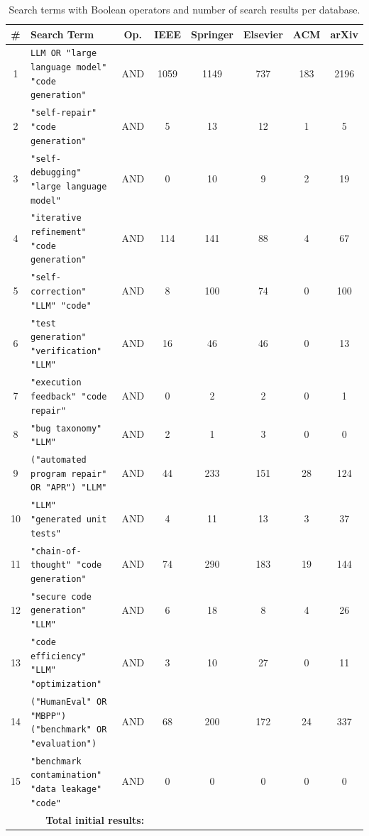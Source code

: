 \documentclass[10pt,a4paper]{article}
\begin{document}
\begin{table}[!t]
\centering
\caption{Search terms with Boolean operators and number of search 
results per database.}
\label{tab:search_terms}
\small
\begin{tabular}{@{}clcccccc@{}}
\toprule
\textbf{\#} & \textbf{Search Term} & \textbf{Op.} 
& \textbf{IEEE} & \textbf{Springer} 
& \textbf{Elsevier} & \textbf{ACM} & \textbf{arXiv} \\
\midrule
1  & \texttt{LLM OR "large language model" "code generation"} 
   & AND & 1059 & 1149 & 737  & 183 & 2196 \\
2  & \texttt{"self-repair" "code generation"} 
   & AND & 5    & 13   & 12   & 1   & 5    \\
3  & \texttt{"self-debugging" "large language model"} 
   & AND & 0    & 10   & 9    & 2   & 19   \\
4  & \texttt{"iterative refinement" "code generation"} 
   & AND & 114  & 141  & 88   & 4   & 67   \\
5  & \texttt{"self-correction" "LLM" "code"} 
   & AND & 8    & 100  & 74   & 0   & 100  \\
6  & \texttt{"test generation" "verification" "LLM"} 
   & AND & 16   & 46   & 46   & 0   & 13   \\
7  & \texttt{"execution feedback" "code repair"} 
   & AND & 0    & 2    & 2    & 0   & 1    \\
8  & \texttt{"bug taxonomy" "LLM"} 
   & AND & 2    & 1    & 3    & 0   & 0    \\
9  & \texttt{("automated program repair" OR "APR") "LLM"} 
   & AND & 44   & 233  & 151  & 28  & 124  \\
10 & \texttt{"LLM" "generated unit tests"} 
   & AND & 4    & 11   & 13   & 3   & 37   \\
11 & \texttt{"chain-of-thought" "code generation"} 
   & AND & 74   & 290  & 183  & 19  & 144  \\
12 & \texttt{"secure code generation" "LLM"} 
   & AND & 6    & 18   & 8    & 4   & 26   \\
13 & \texttt{"code efficiency" "LLM" "optimization"} 
   & AND & 3    & 10   & 27   & 0   & 11   \\
14 & \texttt{("HumanEval" OR "MBPP") 
    ("benchmark" OR "evaluation")} 
   & AND & 68   & 200  & 172  & 24  & 337  \\
15 & \texttt{"benchmark contamination" "data leakage" "code"} 
   & AND & 0    & 0    & 0    & 0   & 0    \\
\midrule
\multicolumn{3}{r}{\textbf{Total initial results:}} 

\end{tabular}
\end{table}
\end{document}
